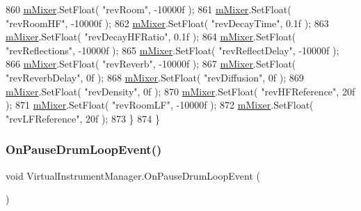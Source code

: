 \begin{DoxyCode}
860             \hyperlink{group___v_i_m_priv_ga08c8db1bb89f4ab1e28451dd93d6b99c}{mMixer}.SetFloat( \textcolor{stringliteral}{"revRoom"}, -10000f );
861             \hyperlink{group___v_i_m_priv_ga08c8db1bb89f4ab1e28451dd93d6b99c}{mMixer}.SetFloat( \textcolor{stringliteral}{"revRoomHF"}, -10000f );
862             \hyperlink{group___v_i_m_priv_ga08c8db1bb89f4ab1e28451dd93d6b99c}{mMixer}.SetFloat( \textcolor{stringliteral}{"revDecayTime"}, 0.1f );
863             \hyperlink{group___v_i_m_priv_ga08c8db1bb89f4ab1e28451dd93d6b99c}{mMixer}.SetFloat( \textcolor{stringliteral}{"revDecayHFRatio"}, 0.1f );
864             \hyperlink{group___v_i_m_priv_ga08c8db1bb89f4ab1e28451dd93d6b99c}{mMixer}.SetFloat( \textcolor{stringliteral}{"revReflections"}, -10000f );
865             \hyperlink{group___v_i_m_priv_ga08c8db1bb89f4ab1e28451dd93d6b99c}{mMixer}.SetFloat( \textcolor{stringliteral}{"revReflectDelay"}, -10000f );
866             \hyperlink{group___v_i_m_priv_ga08c8db1bb89f4ab1e28451dd93d6b99c}{mMixer}.SetFloat( \textcolor{stringliteral}{"revReverb"}, -10000f );
867             \hyperlink{group___v_i_m_priv_ga08c8db1bb89f4ab1e28451dd93d6b99c}{mMixer}.SetFloat( \textcolor{stringliteral}{"revReverbDelay"}, 0f );
868             \hyperlink{group___v_i_m_priv_ga08c8db1bb89f4ab1e28451dd93d6b99c}{mMixer}.SetFloat( \textcolor{stringliteral}{"revDiffusion"}, 0f );
869             \hyperlink{group___v_i_m_priv_ga08c8db1bb89f4ab1e28451dd93d6b99c}{mMixer}.SetFloat( \textcolor{stringliteral}{"revDensity"}, 0f );
870             \hyperlink{group___v_i_m_priv_ga08c8db1bb89f4ab1e28451dd93d6b99c}{mMixer}.SetFloat( \textcolor{stringliteral}{"revHFReference"}, 20f );
871             \hyperlink{group___v_i_m_priv_ga08c8db1bb89f4ab1e28451dd93d6b99c}{mMixer}.SetFloat( \textcolor{stringliteral}{"revRoomLF"}, -10000f );
872             \hyperlink{group___v_i_m_priv_ga08c8db1bb89f4ab1e28451dd93d6b99c}{mMixer}.SetFloat( \textcolor{stringliteral}{"revLFReference"}, 20f );
873         \}
874     \}
\end{DoxyCode}
\mbox{\label{group___v_i_m_handlers_ga30cd7f00fea55becd6d90f0ec737510a}} 
\subsubsection{\texorpdfstring{On\+Pause\+Drum\+Loop\+Event()}{OnPauseDrumLoopEvent()}}
{\footnotesize\ttfamily void Virtual\+Instrument\+Manager.\+On\+Pause\+Drum\+Loop\+Event (\begin{DoxyParamCaption}{ }\end{DoxyParamCaption})}




